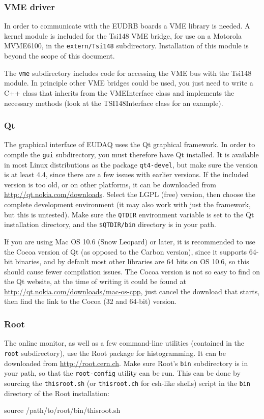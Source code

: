 \subsubsection{VME driver}
In order to communicate with the \gls{EUDRB} boards a VME library is needed.
A kernel module is included for the Tsi148 VME bridge,
for use on a Motorola MVME6100, in the \texttt{extern/Tsi148} subdirectory.
Installation of this module is beyond the scope of this document.

The \texttt{vme} subdirectory includes code for accessing the VME bus with the Tsi148 module.
In principle other VME bridges could be used,
you just need to write a C++ class that inherits from the VMEInterface class
and implements the necessary methods (look at the TSI148Interface class for an example).

\subsubsection{Qt}
The graphical interface of EUDAQ uses the Qt graphical framework.
In order to compile the \texttt{gui} subdirectory, you must therefore have Qt installed.
It is available in most Linux distributions as the package \texttt{qt4-devel},
but make sure the version is at least 4.4, since there are a few issues with earlier versions.
If the included version is too old, or on other platforms,
it can be downloaded from \url{http://qt.nokia.com/downloads}.
Select the LGPL (free) version, then choose the complete development environment
(it may also work with just the framework, but this is untested).
Make sure the \texttt{QTDIR} environment variable is set to the Qt installation directory,
and the \texttt{\$QTDIR/bin} directory is in your path.

If you are using Mac OS 10.6 (Snow Leopard) or later, it is recommended to use the Cocoa version of Qt
(as opposed to the Carbon version), since it supports 64-bit binaries,
and by default most other libraries are 64 bits on OS 10.6, so this should cause fewer compilation issues.
The Cocoa version is not so easy to find on the Qt website, at the time of writing it could be found at
\url{http://qt.nokia.com/downloads/mac-os-cpp},
just cancel the download that starts, then find the link to the Cocoa (32 and 64-bit) version.

\subsubsection{Root}\label{sec:Root}
The online monitor, as well as a few command-line utilities (contained in the \texttt{root} subdirectory),
use the Root package for histogramming.
It can be downloaded from \url{http://root.cern.ch}.
Make sure Root's \texttt{bin} subdirectory is in your path, so that the \texttt{root-config} utility can be run.
This can be done by sourcing the \texttt{thisroot.sh} (or \texttt{thisroot.ch} for csh-like shells)
script in the \texttt{bin} directory of the Root installation:
\begin{listing}[mybash]
source /path/to/root/bin/thisroot.sh
\end{listing}

